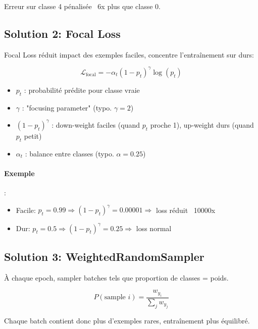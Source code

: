 \documentclass[12pt,a4paper,oneside]{report}
\begin{document}
Erreur sur classe 4 pénalisée ~6x plus que classe 0.

\subsection{Solution 2: Focal Loss}

Focal Loss réduit impact des exemples faciles, concentre l'entraînement 
sur durs:

\begin{equation}
\mathcal{L}_{\text{focal}} = -\alpha_t (1 - p_t)^\gamma \log(p_t)
\label{eq:focal_loss}
\end{equation}

\begin{itemize}
    \item $p_t$ : probabilité prédite pour classe vraie
    \item $\gamma$ : "focusing parameter" (typo. $\gamma = 2$)
    \item $(1 - p_t)^\gamma$ : down-weight faciles (quand $p_t$ proche 1), 
          up-weight durs (quand $p_t$ petit)
    \item $\alpha_t$ : balance entre classes (typo. $\alpha = 0.25$)
\end{itemize}

\paragraph{Exemple} :
\begin{itemize}
    \item Facile: $p_t = 0.99 \Rightarrow (1-p_t)^\gamma = 0.00001 \Rightarrow$ 
          loss réduit ~10000x
    \item Dur: $p_t = 0.5 \Rightarrow (1-p_t)^\gamma = 0.25 \Rightarrow$ 
          loss normal
\end{itemize}

\subsection{Solution 3: WeightedRandomSampler}

À chaque epoch, sampler batches tels que proportion de classes = poids.

\begin{equation}
P(\text{sample } i) = \frac{w_{y_i}}{\sum_j w_{y_j}}
\end{equation}

Chaque batch contient donc plus d'exemples rares, entraînement plus 
équilibré.
\end{document}
